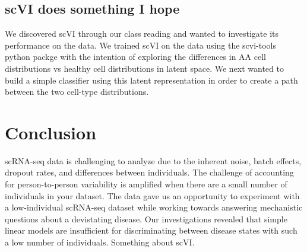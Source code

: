 \documentclass{article}
\begin{document}
\subsection{scVI does something I hope}
We discovered scVI through our class reading and wanted to investigate its performance on the \citet{tonglin_single-cell_2022} data.
We trained scVI on the \citet{tonglin_single-cell_2022} data using the scvi-tools python packge \citep{gayoso_python_2022} with the intention of exploring the differences in AA cell distributions vs healthy cell distributions in latent space.
We next wanted to build a simple classifier using this latent representation in order to create a path between the two cell-type distributions.


\section{Conclusion}
scRNA-seq data is challenging to analyze due to the inherent noise, batch effects, dropout rates, and differences between individuals.
The challenge of accounting for person-to-person variability is amplified when there are a small number of individuals in your dataset.
The \citet{tonglin_single-cell_2022} data gave us an opportunity to experiment with a low-individual scRNA-seq dataset while working towards answering mechanistic questions about a devistating disease.
Our investigations revealed that simple linear models are insufficient for discriminating between disease states with such a low number of individuals.
Something about scVI.


{
\small
\printbibliography
}
\end{document}
